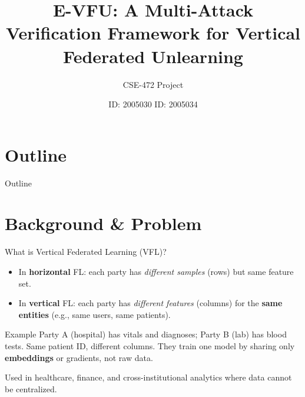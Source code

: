 \documentclass[11pt,aspectratio=169]{beamer}
\title{E-VFU: A Multi-Attack Verification Framework for Vertical Federated Unlearning}
\subtitle{CSE-472 Project}
\author{ID: 2005030 \quad ID: 2005034}
\institute{}
\date{}
\begin{document}
\begin{frame}
  \titlepage
\end{frame}

\section{Outline}
\begin{frame}{Outline}
  \tableofcontents
\end{frame}

\section{Background \& Problem}

\begin{frame}{What is Vertical Federated Learning (VFL)?}
  \begin{itemize}
    \item In \textbf{horizontal} FL: each party has \emph{different samples} (rows) but same feature set.
    \item In \textbf{vertical} FL: each party has \emph{different features} (columns) for the \textbf{same entities} (e.g., same users, same patients).
  \end{itemize}
  \vspace{0.5em}
  \begin{block}{Example}
    Party A (hospital) has vitals and diagnoses; Party B (lab) has blood tests. Same patient ID, different columns. They train one model by sharing only \textbf{embeddings} or gradients, not raw data.
  \end{block}
  \vspace{0.5em}
  Used in healthcare, finance, and cross-institutional analytics where data cannot be centralized.
\end{frame}
\end{document}
